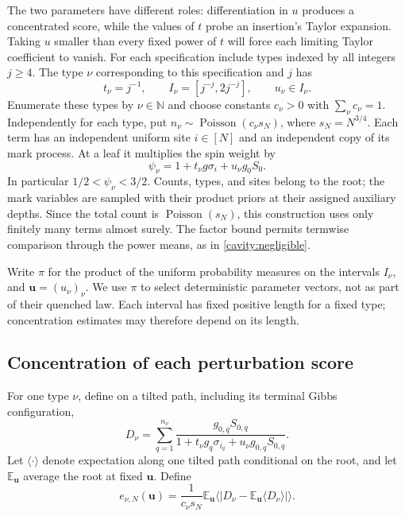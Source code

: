 The two parameters have different roles: differentiation in $u$ produces
a concentrated score, while the values of $t$ probe an insertion's Taylor
expansion. Taking $u$ smaller than every fixed power of $t$ will force
each limiting Taylor coefficient to vanish. For each specification
include types indexed by all integers $j\geq4$.
The type $\nu$ corresponding to this specification and $j$ has
\begin{equation}
 t_\nu=j^{-1},\qquad
 I_\nu=[j^{-j},2j^{-j}],\qquad u_\nu\in I_\nu.
 \label{pert:parameters}
\end{equation}
Enumerate these types by $\nu\in\mathbb N$ and choose constants
$c_\nu>0$ with $\sum_\nu c_\nu=1$.  Independently for each type, put
$n_\nu\sim\operatorname{Poisson}(c_\nu s_N)$, where $s_N=N^{3/4}$.
Each term has an independent uniform site $i\in[N]$ and an independent
copy of its mark process.  At a leaf it multiplies the spin weight by
\begin{equation}
 \psi_\nu=1+t_\nu g\sigma_i+u_\nu g_0S_0.
 \label{pert:factor}
\end{equation}
In particular $1/2<\psi_\nu<3/2$.  Counts, types, and sites belong to the
root; the mark variables are sampled with their product priors at their
assigned auxiliary depths.  Since the total count is
$\operatorname{Poisson}(s_N)$, this construction uses only finitely many
terms almost surely.  The factor bound permits termwise comparison
through the power means, as in \eqref{cavity:negligible}.

Write $\pi$ for the product of the uniform probability measures on the
intervals $I_\nu$, and $\mathbf u=(u_\nu)_\nu$. We use $\pi$ to select
deterministic parameter vectors, not as part of their quenched law.
Each interval has fixed positive length for a fixed type; concentration
estimates may therefore depend on its length.

\subsection{Concentration of each perturbation score}

For one type $\nu$, define on a tilted path, including its terminal
Gibbs configuration,
\begin{equation}
 D_\nu=\sum_{q=1}^{n_\nu}
 \frac{g_{0,q}S_{0,q}}
 {1+t_\nu g_q\sigma_{i_q}+u_\nu g_{0,q}S_{0,q}}.
 \label{pert:score}
\end{equation}
Let $\langle\cdot\rangle$ denote expectation along one tilted path
conditional on the root, and let $\mathbb E_{\mathbf u}$ average the
root at fixed $\mathbf u$.  Define
\begin{equation}
 e_{\nu,N}(\mathbf u)
 =\frac{1}{c_\nu s_N}
 \mathbb E_{\mathbf u}\Big\langle
 \big|D_\nu-\mathbb E_{\mathbf u}\langle D_\nu\rangle\big|
 \Big\rangle.
 \label{pert:error}
\end{equation}

